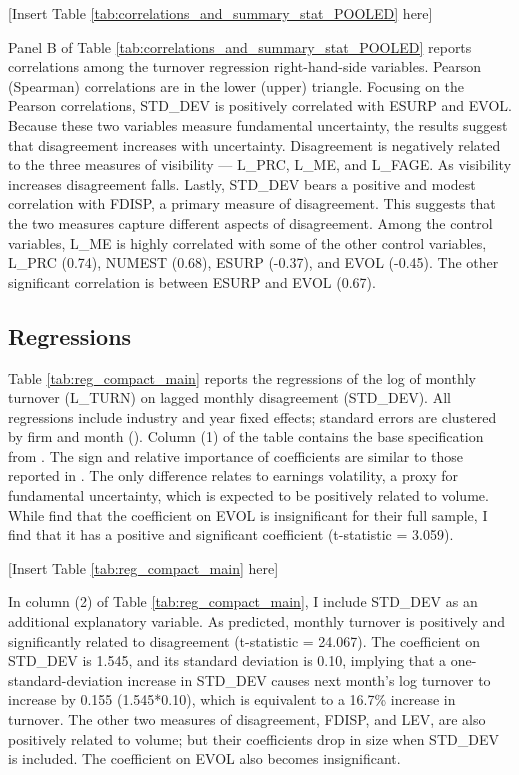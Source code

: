 \documentclass[
  12pt,
  a4paper,
  twoside,
  onecolumn]{article}
\begin{document}
\begin{center} { [Insert Table \ref{tab:correlations_and_summary_stat_POOLED} here] } \end{center}

Panel B of Table \ref{tab:correlations_and_summary_stat_POOLED} reports
correlations among the turnover regression right-hand-side variables.
Pearson (Spearman) correlations are in the lower (upper) triangle.
Focusing on the Pearson correlations, STD\_DEV is positively correlated
with ESURP and EVOL. Because these two variables measure fundamental
uncertainty, the results suggest that disagreement increases with
uncertainty. Disagreement is negatively related to the three measures of
visibility --- L\_PRC, L\_ME, and L\_FAGE. As visibility increases
disagreement falls. Lastly, STD\_DEV bears a positive and modest
correlation with FDISP, a primary measure of disagreement. This suggests
that the two measures capture different aspects of disagreement. Among
the control variables, L\_ME is highly correlated with some of the other
control variables, L\_PRC (0.74), NUMEST (0.68), ESURP (-0.37), and EVOL
(-0.45). The other significant correlation is between ESURP and EVOL
(0.67).

\hypertarget{subsec:reg_results}{%
\subsection{Regressions}\label{subsec:reg_results}}

Table \ref{tab:reg_compact_main} reports the regressions of the log of
monthly turnover (L\_TURN) on lagged monthly disagreement (STD\_DEV).
All regressions include industry and year fixed effects; standard errors
are clustered by firm and month (\cite{petersen2009}). Column (1) of the
table contains the base specification from
. The sign and relative importance of
coefficients are similar to those reported in
. The only difference relates to earnings
volatility, a proxy for fundamental uncertainty, which is expected to be
positively related to volume. While  find
that the coefficient on EVOL is insignificant for their full sample, I
find that it has a positive and significant coefficient (t-statistic =
3.059).

\begin{center} { [Insert Table \ref{tab:reg_compact_main} here] } \end{center}

In column (2) of Table \ref{tab:reg_compact_main}, I include STD\_DEV as
an additional explanatory variable. As predicted, monthly turnover is
positively and significantly related to disagreement (t-statistic =
24.067). The coefficient on STD\_DEV is 1.545, and its standard
deviation is 0.10, implying that a one-standard-deviation increase in
STD\_DEV causes next month's log turnover to increase by 0.155
(1.545*0.10), which is equivalent to a 16.7\% increase in turnover. The
other two measures of disagreement, FDISP, and LEV, are also positively
related to volume; but their coefficients drop in size when STD\_DEV is
included. The coefficient on EVOL also becomes insignificant.
\end{document}
